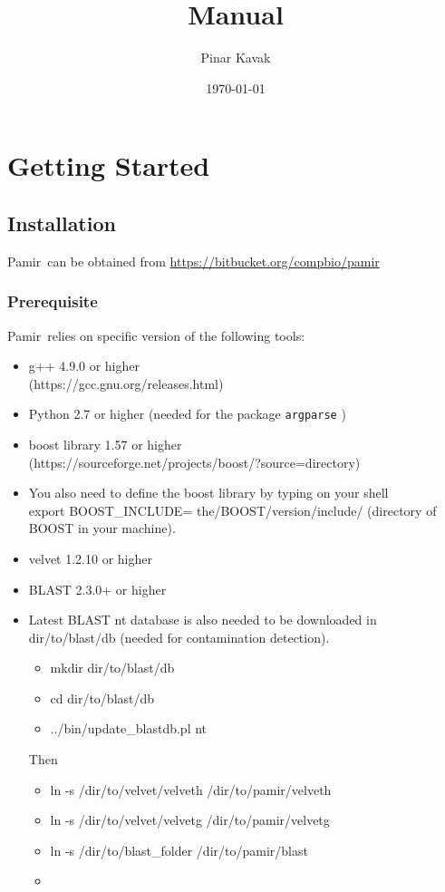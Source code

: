 \documentclass{article}
\title{\toolName Manual}
\author{Pinar Kavak}
\date{\today}
\newcommand{\toolName}{Pamir~}
\newcommand{\gitUrl}{https://bitbucket.org/compbio/pamir}
\begin{document}
\maketitle

\tableofcontents
\newpage

\section{Getting Started}

\subsection{Installation}
\toolName can be obtained from \url{\gitUrl}

\subsubsection{Prerequisite}
\toolName relies on specific version of the following tools:
\begin{itemize}
\item g++ 4.9.0 or higher \\
(https://gcc.gnu.org/releases.html)
\item Python 2.7 or higher (needed for the package \texttt{argparse} )
\item boost library 1.57 or higher \\ (https://sourceforge.net/projects/boost/?source=directory)
\item You also need to define the boost library by typing on your shell \\
export BOOST\_INCLUDE= the/BOOST/version/include/ (directory of BOOST in your machine).
\item velvet 1.2.10 or higher
\item BLAST 2.3.0+ or higher
\item Latest BLAST nt database is also needed to be downloaded in dir/to/blast/db (needed for contamination detection). 
\begin{itemize}
\item mkdir dir/to/blast/db
\item cd dir/to/blast/db
\item ../bin/update\_blastdb.pl nt
\end{itemize}
Then
\begin{itemize}
\item ln -s /dir/to/velvet/velveth /dir/to/pamir/velveth
\item ln -s /dir/to/velvet/velvetg /dir/to/pamir/velvetg
\item ln -s /dir/to/blast\_folder /dir/to/pamir/blast
\item
\end{itemize}
\end{itemize}
\end{document}
